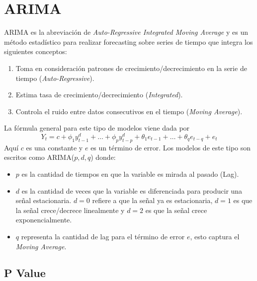 \section{ARIMA}

ARIMA es la abreviación de \textit{Auto-Regressive Integrated Moving Average} y es un método estadístico para realizar forecasting sobre series de tiempo que integra los siguientes conceptos:

\begin{enumerate}
    \item Toma en consideración patrones de crecimiento/decrecimiento en la serie de tiempo (\textit{Auto-Regressive}). 
    \item Estima tasa de crecimiento/decrecimiento (\textit{Integrated}).
    \item Controla el ruido entre datos consecutivos en el tiempo (\textit{Moving Average}).
\end{enumerate}

La fórmula general para este tipo de modelos viene dada por 
$$
Y_t = c + \phi_1y^d_{t-1} + \dots + \phi_py^d_{t-p} + \theta_1e_{t-1} + \dots + \theta_q e_{t-q} + e_t
$$
Aquí $c$ es una constante y $e$ es un término de error. Los modelos de este tipo son escritos como ARIMA($p,d,q$) donde: 

\begin{itemize}
    \item $p$ es la cantidad de tiempos en que la variable es mirada al pasado (Lag).
    \item $d$ es la cantidad de veces que la variable es diferenciada para producir una señal estacionaria. $d=0$ refiere a que la señal ya es estacionaria, $d=1$ es que la señal crece/decrece linealmente y $d=2$ es que la señal crece exponencialmente. 
    \item $q$ representa la cantidad de lag para el término de error $e$, esto captura el \textit{Moving Average}.
\end{itemize}

\subsection{P Value}

